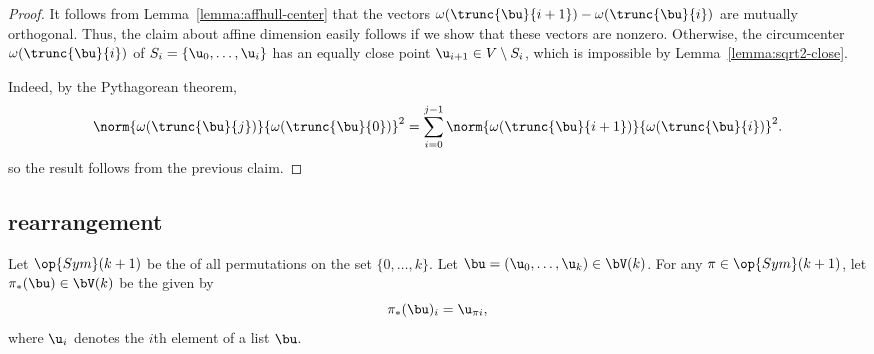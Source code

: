 \begin{proof}
It follows from  Lemma~\ref{lemma:affhull-center} that the vectors 
${\omega(\trunc{\bu}{i+1})}-{\omega(\trunc{\bu}{i})}$ are mutually orthogonal.
Thus, the claim about affine dimension easily follows if we show that these vectors
are nonzero.
Otherwise, the
circumcenter $\omega(\trunc{\bu}{i})$ of $S_i=\{\u_0,\ldots,\u_i\}$
has an equally close point $ \u_{i+1}\in V\setminus S_i$, which is
impossible by Lemma~\ref{lemma:sqrt2-close}.

Indeed, by the Pythagorean theorem,
\begin{equation}
\norm{\omega(\trunc{\bu}{j})}{\omega(\trunc{\bu}{0})}^2 =
\sum_{i=0}^{j-1} \norm{\omega(\trunc{\bu}{i+1})}{\omega(\trunc{\bu}{i})}^2.
\end{equation}
so the result follows from the
previous claim.
\end{proof}




\subsection{rearrangement}


Let $\op{Sym}(k+1)$ be the  of all permutations on the
set $\{0,\ldots,k\}$.  Let $\bu = ( \u_0,\ldots, \u_k)\in \bV(k)$.  For any
 $\pi\in\op{Sym}(k+1)$, let $\pi_*(\bu)\in
\bV(k)$ be the  given by
\begin{displaymath}
\pi_*(\bu)_i =  \u_{\pi i},
\end{displaymath}   
where $\u_i$ denotes the $i$th element of a list $\bu$.


